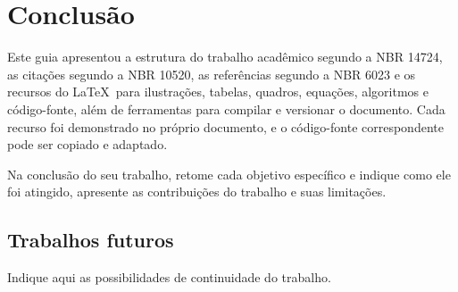\chapter{Conclusão}\label{cap:conclusao}

Este guia apresentou a estrutura do trabalho acadêmico segundo a NBR 14724, as citações segundo a NBR 10520, as referências segundo a NBR 6023 e os recursos do \LaTeX\ para ilustrações, tabelas, quadros, equações, algoritmos e código-fonte, além de ferramentas para compilar e versionar o documento. Cada recurso foi demonstrado no próprio documento, e o código-fonte correspondente pode ser copiado e adaptado.

Na conclusão do seu trabalho, retome cada objetivo específico e indique como ele foi atingido, apresente as contribuições do trabalho e suas limitações.

\section{Trabalhos futuros}\label{sec:trabalhos-futuros}

Indique aqui as possibilidades de continuidade do trabalho.
